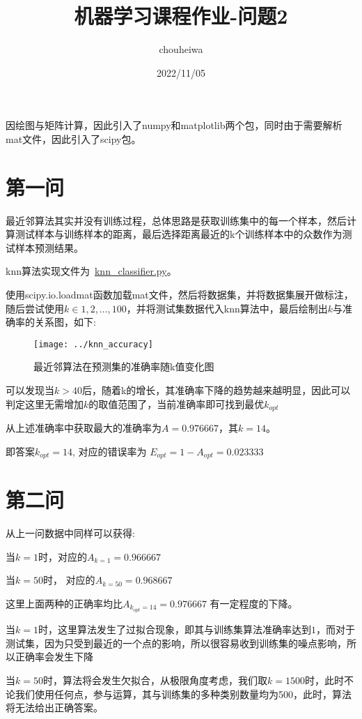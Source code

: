 \documentclass[UTF8]{article} %
\title{机器学习课程作业-问题2}
\author{chouheiwa}
\date{2022/11/05}
\begin{document}
    \maketitle
    \tableofcontents
    因绘图与矩阵计算，因此引入了numpy和matplotlib两个包，同时由于需要解析mat文件，因此引入了scipy包。


    \section{第一问}
    最近邻算法其实并没有训练过程，总体思路是获取训练集中的每一个样本，然后计算测试样本与训练样本的距离，最后选择距离最近的k个训练样本中的众数作为测试样本预测结果。

    knn算法实现文件为~\href{run:knn_classifier.py}{knn\_classifier.py}。

    使用scipy.io.loadmat函数加载mat文件，然后将数据集，并将数据集展开做标注，随后尝试使用$k \in 1 , 2,\dots, 100$，并将测试集数据代入knn算法中，最后绘制出$k$与准确率的关系图，如下:

    \begin{figure}[htbp]
        \centering
        \texttt{[image: ../knn\_accuracy]}
        \caption{最近邻算法在预测集的准确率随k值变化图}
    \end{figure}

    可以发现当$k > 40$后，随着k的增长，其准确率下降的趋势越来越明显，因此可以判定这里无需增加$k$的取值范围了，当前准确率即可找到最优$k_{opt}$

    从上述准确率中获取最大的准确率为$A = 0.976667$，其$k = 14$。

    即答案$k_{opt} = 14$, 对应的错误率为 $E_{opt} = 1 - A_{opt} = 0.023333$


    \section{第二问}

    从上一问数据中同样可以获得:

    当$k = 1$时，对应的$A_{k=1} = 0.966667$

    当$k = 50$时， 对应的$A_{k=50} = 0.968667$

    这里上面两种的正确率均比$A_{k_{opt} = 14} = 0.976667$ 有一定程度的下降。

    当$k = 1$时，这里算法发生了过拟合现象，即其与训练集算法准确率达到$1$，而对于测试集，因为只受到最近的一个点的影响，所以很容易收到训练集的噪点影响，所以正确率会发生下降

    当$k = 50$时，算法将会发生欠拟合，从极限角度考虑，我们取$k = 1500$时，此时不论我们使用任何点，参与运算，其与训练集的多种类别数量均为500，此时，算法将无法给出正确答案。
\end{document}
